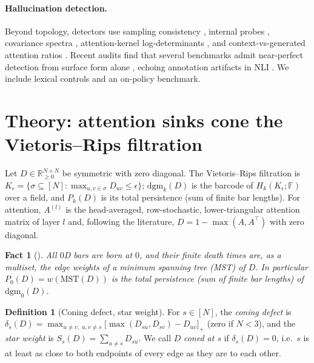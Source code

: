 \documentclass{article}
\newtheorem{fact}{Fact}
\theoremstyle{definition}
\newtheorem{definition}{Definition}
\newcommand{\dgm}{\mathrm{dgm}}
\newcommand{\defect}{\delta}
\newcommand{\stw}{S}
\begin{document}
\paragraph{Hallucination detection.} Beyond topology, detectors use sampling consistency \citep{manakul2023selfcheckgpt,farquhar2024semantic}, internal probes \citep{azaria2023internal,burns2022discovering,marks2023geometry,li2023iti,kossen2024semantic,orgad2024llms,du2024haloscope}, covariance spectra \citep{chen2024inside}, attention-kernel log-determinants \citep{sriramanan2024llmcheck}, and context-vs-generated attention ratios \citep{chuang2024lookback}. Recent audits find that several benchmarks admit near-perfect detection from surface form alone \citep{hussain2026parallax,janiak2025illusion}, echoing annotation artifacts in NLI \citep{gururangan2018annotation,mccoy2019right}. We include lexical controls and an on-policy benchmark.

\section{Theory: attention sinks cone the Vietoris--Rips filtration}
\label{sec:theory}

Let $D\in\mathbb{R}_{\ge0}^{N\times N}$ be symmetric with zero diagonal. The Vietoris--Rips filtration is $K_\epsilon=\{\sigma\subseteq[N]:\max_{u,v\in\sigma}D_{uv}\le\epsilon\}$; $\dgm_k(D)$ is the barcode of $H_k(K_\epsilon;\mathbb{F})$ over a field, and $P_k(D)$ is its total persistence (sum of finite bar lengths). For attention, $A^{(l)}$ is the head-averaged, row-stochastic, lower-triangular attention matrix of layer $l$ and, following the literature, $D=1-\max(A,A^\top)$ with zero diagonal.

\begin{fact}[\citealp{gower1969}]
\label{fact:mst}
All $0$D bars are born at $0$, and their finite death times are, as a multiset, the edge weights of a minimum spanning tree (MST) of $D$. In particular $P_0(D)=w(\mathrm{MST}(D))$ is the total persistence (sum of finite bar lengths) of $\dgm_0(D)$.
\end{fact}

\begin{definition}[Coning defect, star weight]
For $s\in[N]$, the \emph{coning defect} is $\defect_s(D)=\max_{u\ne v,\;u,v\ne s}\big[\max(D_{su},D_{sv})-D_{uv}\big]_+$ (zero if $N<3$), and the \emph{star weight} is $\stw_s(D)=\sum_{u\ne s}D_{su}$. We call $D$ \emph{coned at $s$} if $\defect_s(D)=0$, i.e.\ $s$ is at least as close to both endpoints of every edge as they are to each other.
\end{definition}
\end{document}
